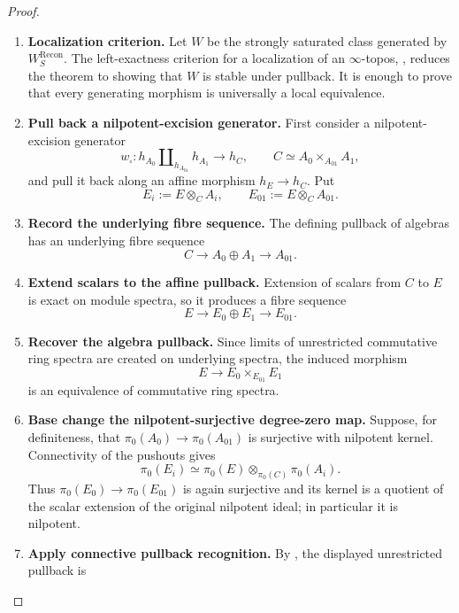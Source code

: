 \begin{proof}
\leavevmode
\begin{enumerate}[label=\textup{(\arabic*)}]
    \item \textbf{Localization criterion.}
    Let \(W\) be the strongly saturated class generated by
    \(W^{\mathrm{Recon}}_S\). The left-exactness criterion for a localization of an \(\infty\)-topos,
    \cite[Proposition~6.2.1.1]{LurieHigherToposTheory}, reduces the theorem to
    showing that \(W\) is stable under pullback. It is enough to prove that every generating morphism
    is universally a local equivalence.
    \item \textbf{Pull back a nilpotent-excision generator.}
    First consider a nilpotent-excision generator
    \[
        w_\square:
        h_{A_0}\amalg_{h_{A_{01}}}h_{A_1}
        \longrightarrow
        h_C,
        \qquad
        C\simeq A_0\times_{A_{01}}A_1,
    \]
    and pull it back along an affine morphism \(h_E\to h_C\). Put
    \[
        E_i:=E\otimes_CA_i,
        \qquad
        E_{01}:=E\otimes_CA_{01}.
    \]
    \item \textbf{Record the underlying fibre sequence.}
    The defining pullback of algebras has an underlying fibre sequence
    \[
        C\longrightarrow A_0\oplus A_1\longrightarrow A_{01}.
    \]
    \item \textbf{Extend scalars to the affine pullback.}
    Extension of scalars from \(C\) to \(E\) is exact on module spectra, so it
    produces a fibre sequence
    \[
        E\longrightarrow E_0\oplus E_1\longrightarrow E_{01}.
    \]
    \item \textbf{Recover the algebra pullback.}
    Since limits of unrestricted commutative ring spectra are created on underlying
    spectra, the induced morphism
    \[
        E\longrightarrow E_0\times_{E_{01}}E_1
    \]
    is an equivalence of commutative ring spectra.
    \item \textbf{Base change the nilpotent-surjective degree-zero map.}
    Suppose, for definiteness,
    that \(\pi_0(A_0)\to\pi_0(A_{01})\) is surjective with nilpotent kernel. Connectivity
    of the pushouts gives
    \[
        \pi_0(E_i)
        \simeq
        \pi_0(E)\otimes_{\pi_0(C)}\pi_0(A_i).
    \]
    Thus \(\pi_0(E_0)\to\pi_0(E_{01})\) is again surjective and its kernel is a
    quotient of the scalar extension of the original nilpotent ideal; in
    particular it is nilpotent.
    \item \textbf{Apply connective pullback recognition.}
    By
    , the displayed unrestricted pullback is

\end{enumerate}
\end{proof}
